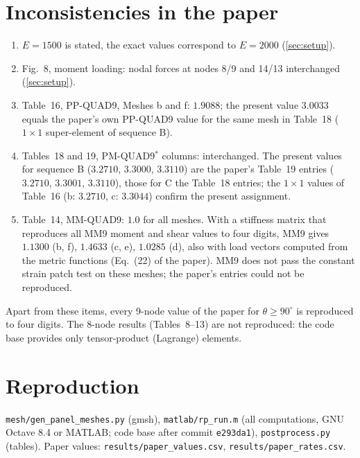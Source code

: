 \documentclass[10pt,a4paper]{article}
\begin{document}
\section{Inconsistencies in the paper}\label{sec:paper}
\begin{enumerate}
\item $E=1500$ is stated, the exact values correspond to $E=2000$ (\cref{sec:setup}).
\item Fig.~8, moment loading: nodal forces at nodes 8/9 and 14/13 interchanged (\cref{sec:setup}).
\item Table~16, PP-QUAD9, Meshes b and f: $1.9088$; the present value $3.0033$ equals the paper's
  own PP-QUAD9 value for the same mesh in Table~18 ($1\times1$ super-element of sequence B).
\item Tables~18 and 19, PM-QUAD9$^\ast$ columns: interchanged. The present values for sequence B
  ($3.2710$, $3.3000$, $3.3110$) are the paper's Table~19 entries ($3.2710$, $3.3001$, $3.3110$),
  those for C the Table~18 entries; the $1\times1$ values of Table~16 (b: $3.2710$, c: $3.3044$)
  confirm the present assignment.
\item Table~14, MM-QUAD9: $1.0$ for all meshes. With a stiffness matrix that reproduces all MM9
  moment and shear values to four digits, MM9 gives $1.1300$ (b, f), $1.4633$ (c, e), $1.0285$ (d),
  also with load vectors computed from the metric functions (Eq.~(22) of the paper). MM9 does not
  pass the constant strain patch test on these meshes; the paper's entries could not be reproduced.
\end{enumerate}
Apart from these items, every 9-node value of the paper for $\theta\ge90^\circ$ is reproduced to
four digits. The 8-node results (Tables~8--13) are not reproduced: the code base provides only
tensor-product (Lagrange) elements.

\section{Reproduction}
\texttt{mesh/gen\_panel\_meshes.py} (gmsh), \texttt{matlab/rp\_run.m} (all computations, GNU
Octave 8.4 or MATLAB; code base after commit \texttt{e293da1}), \texttt{postprocess.py} (tables). Paper values:
\texttt{results/paper\_values.csv}, \texttt{results/paper\_rates.csv}.



\end{document}
